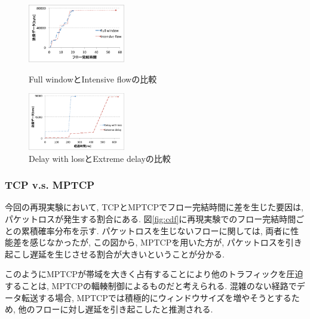 \begin{figure}[t]
 \begin{minipage}{0.5\hsize}
    \begin{center}
    \includegraphics[autoebb, width=120pt]{./img/full_intensive.pdf}
    \caption{Full windowとIntensive flowの比較}
    \label{fig:full_intensive}
    \end{center}
 \end{minipage}
 \begin{minipage}{0.5\hsize}
    \begin{center}
    \includegraphics[autoebb, width=120pt]{./img/loss.pdf}
    \caption{Delay with lossとExtreme delayの比較}
    \label{fig:delay_loss}
    \end{center}
 \end{minipage}
\end{figure}

\subsubsection{TCP v.s. MPTCP}
今回の再現実験において, TCPとMPTCPでフロー完結時間に差を生じた要因は, パケットロスが発生する割合にある.
図\ref{fig:cdf}に再現実験でのフロー完結時間ごとの累積確率分布を示す.
パケットロスを生じないフローに関しては, 両者に性能差を感じなかったが, この図から, MPTCPを用いた方が,
パケットロスを引き起こし遅延を生じさせる割合が大きいということが分かる.

このようにMPTCPが帯域を大きく占有することにより他のトラフィックを圧迫することは, MPTCPの輻輳制御によるものだと考えられる.
混雑のない経路でデータ転送する場合, MPTCPでは積極的にウィンドウサイズを増やそうとするため, 他のフローに対し遅延を引き起こしたと推測される.


